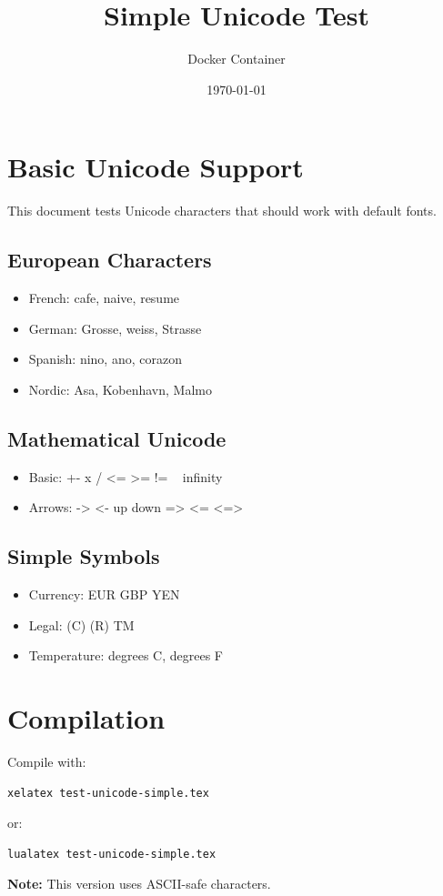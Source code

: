 \documentclass[12pt,a4paper]{article}
\title{Simple Unicode Test}
\author{Docker Container}
\date{\today}
\begin{document}
\maketitle

\section{Basic Unicode Support}
This document tests Unicode characters that should work with default fonts.

\subsection{European Characters}
\begin{itemize}
    \item French: cafe, naive, resume
    \item German: Grosse, weiss, Strasse
    \item Spanish: nino, ano, corazon
    \item Nordic: Asa, Kobenhavn, Malmo
\end{itemize}

\subsection{Mathematical Unicode}
\begin{itemize}
    \item Basic: +- x / <= >= != ~ infinity
    \item Arrows: -> <- up down => <= <=>
\end{itemize}

\subsection{Simple Symbols}
\begin{itemize}
    \item Currency: EUR GBP YEN
    \item Legal: (C) (R) TM
    \item Temperature: degrees C, degrees F
\end{itemize}

\section{Compilation}
Compile with:
\begin{verbatim}
xelatex test-unicode-simple.tex
\end{verbatim}
or:
\begin{verbatim}
lualatex test-unicode-simple.tex
\end{verbatim}

\textbf{Note:} This version uses ASCII-safe characters.
\end{document}
